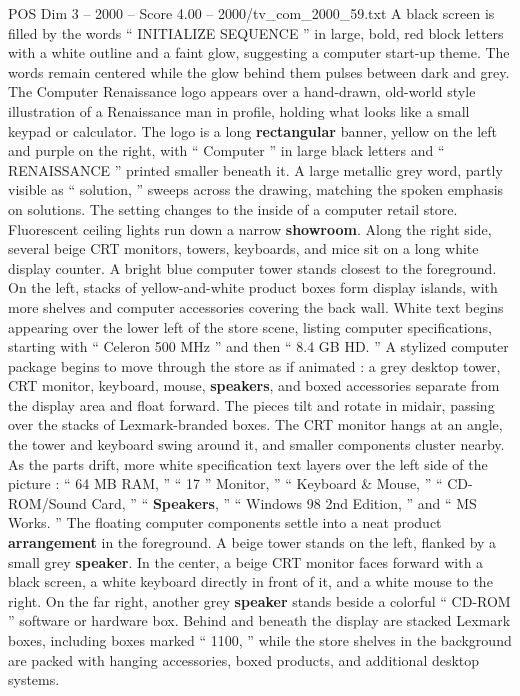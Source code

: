 \begin{textsample}{POS Dim 3 – 2000 – Score 4.00 – 2000/tv\_com\_2000\_59.txt}  \label{ex:f3_pos_067}
A black screen is filled by the words “ INITIALIZE SEQUENCE ” in large, bold, red block letters with a white outline and a faint glow, suggesting a computer start-up theme.
The words remain centered while the glow behind them pulses between dark and grey.
The Computer Renaissance logo appears over a hand-drawn, old-world style illustration of a Renaissance man in profile, holding what looks like a small keypad or calculator.
The logo is a long \textbf{rectangular} banner, yellow on the left and purple on the right, with “ Computer ” in large black letters and “ RENAISSANCE ” printed smaller beneath it.
A large metallic grey word, partly visible as “ solution, ” sweeps across the drawing, matching the spoken emphasis on solutions.
The setting changes to the inside of a computer retail store.
Fluorescent ceiling lights run down a narrow \textbf{showroom}.
Along the right side, several beige CRT monitors, towers, keyboards, and mice sit on a long white display counter.
A bright blue computer tower stands closest to the foreground.
On the left, stacks of yellow-and-white product boxes form display islands, with more shelves and computer accessories covering the back wall.
White text begins appearing over the lower left of the store scene, listing computer specifications, starting with “ Celeron 500 MHz ” and then “ 8.4 GB HD. ” A stylized computer package begins to move through the store as if animated : a grey desktop tower, CRT monitor, keyboard, mouse, \textbf{speakers}, and boxed accessories separate from the display area and float forward.
The pieces tilt and rotate in midair, passing over the stacks of Lexmark-branded boxes.
The CRT monitor hangs at an angle, the tower and keyboard swing around it, and smaller components cluster nearby.
As the parts drift, more white specification text layers over the left side of the picture : “ 64 MB RAM, ” “ 17 ” Monitor, ” “ Keyboard \& Mouse, ” “ CD-ROM/Sound Card, ” “ \textbf{Speakers}, ” “ Windows 98 2nd Edition, ” and “ MS Works. ” The floating computer components settle into a neat product \textbf{arrangement} in the foreground.
A beige tower stands on the left, flanked by a small grey \textbf{speaker}.
In the center, a beige CRT monitor faces forward with a black screen, a white keyboard directly in front of it, and a white mouse to the right.
On the far right, another grey \textbf{speaker} stands beside a colorful “ CD-ROM ” software or hardware box.
Behind and beneath the display are stacked Lexmark boxes, including boxes marked “ 1100, ” while the store shelves in the background are packed with hanging accessories, boxed products, and additional desktop systems.

\end{textsample}
